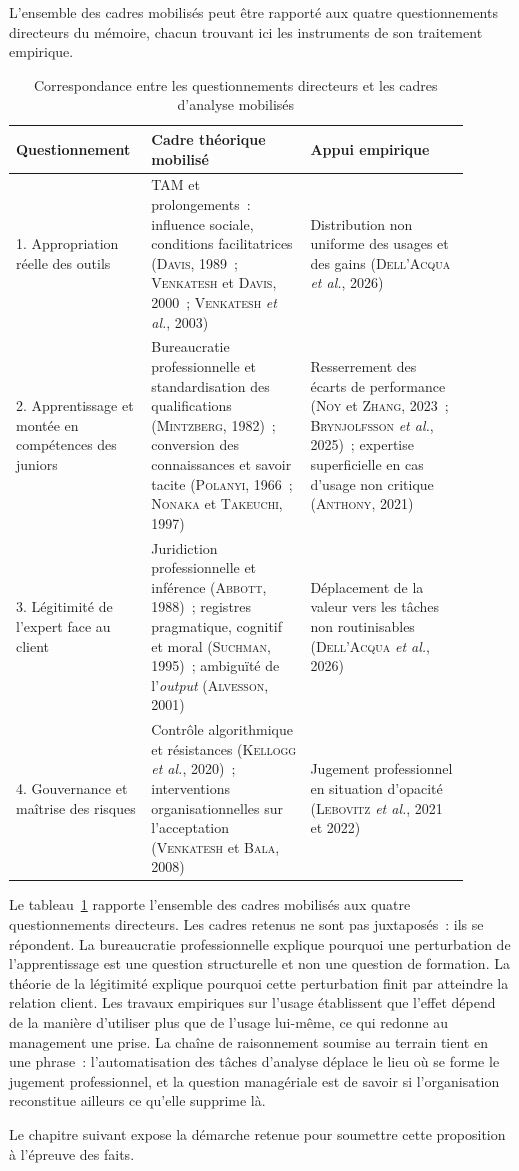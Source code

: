 L'ensemble des cadres mobilisés peut être rapporté aux quatre questionnements directeurs du
mémoire, chacun trouvant ici les instruments de son traitement empirique.

\begin{table}[h]
\centering
\small
\begin{tabular}{|p{0.24\linewidth}|p{0.33\linewidth}|p{0.33\linewidth}|}
\hline
\textbf{Questionnement} & \textbf{Cadre théorique mobilisé} & \textbf{Appui empirique} \\
\hline
1. Appropriation réelle des outils
& TAM et prolongements~: influence sociale, conditions facilitatrices
(\textsc{Davis}, 1989~; \textsc{Venkatesh} et \textsc{Davis}, 2000~;
\textsc{Venkatesh} \textit{et al.}, 2003)
& Distribution non uniforme des usages et des gains
(\textsc{Dell'Acqua} \textit{et al.}, 2026) \\
\hline
2. Apprentissage et montée en compétences des juniors
& Bureaucratie professionnelle et standardisation des qualifications
(\textsc{Mintzberg}, 1982)~; conversion des connaissances et savoir tacite
(\textsc{Polanyi}, 1966~; \textsc{Nonaka} et \textsc{Takeuchi}, 1997)
& Resserrement des écarts de performance (\textsc{Noy} et \textsc{Zhang}, 2023~;
\textsc{Brynjolfsson} \textit{et al.}, 2025)~; expertise superficielle en cas d'usage non
critique (\textsc{Anthony}, 2021) \\
\hline
3. Légitimité de l'expert face au client
& Juridiction professionnelle et inférence (\textsc{Abbott}, 1988)~; registres
pragmatique, cognitif et moral (\textsc{Suchman}, 1995)~; ambiguïté de l'\textit{output}
(\textsc{Alvesson}, 2001) & Déplacement de la valeur vers les tâches non routinisables
(\textsc{Dell'Acqua} \textit{et al.}, 2026) \\
\hline
4. Gouvernance et maîtrise des risques
& Contrôle algorithmique et résistances (\textsc{Kellogg} \textit{et al.}, 2020)~;
interventions organisationnelles sur l'acceptation (\textsc{Venkatesh} et \textsc{Bala},
2008) & Jugement professionnel en situation d'opacité (\textsc{Lebovitz} \textit{et al.},
2021 et 2022) \\
\hline
\end{tabular}
\caption{Correspondance entre les questionnements directeurs et les cadres d'analyse
mobilisés}
\label{tab:cadres-questionnements}
\end{table}

Le tableau~\ref{tab:cadres-questionnements} rapporte l'ensemble des cadres mobilisés aux quatre questionnements directeurs. Les cadres retenus ne sont pas juxtaposés~: ils se
répondent. La bureaucratie professionnelle explique pourquoi une perturbation de
l'apprentissage est une question structurelle et non une question de formation. La théorie
de la légitimité explique pourquoi cette perturbation finit par atteindre la relation
client. Les travaux empiriques sur l'usage établissent que l'effet dépend de la manière
d'utiliser plus que de l'usage lui-même, ce qui redonne au management une prise. La chaîne
de raisonnement soumise au terrain tient en une phrase~: l'automatisation des tâches
d'analyse déplace le lieu où se forme le jugement professionnel, et la question managériale
est de savoir si l'organisation reconstitue ailleurs ce qu'elle supprime là.

Le chapitre suivant expose la démarche retenue pour soumettre cette proposition à
l'épreuve des faits.